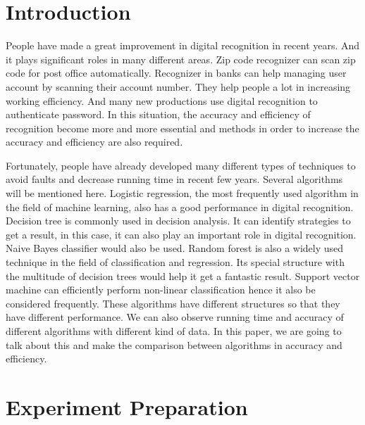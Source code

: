 \documentclass[sigconf]{acmart}
\begin{document}


\maketitle



\section{Introduction}

People have made a great improvement in digital recognition in recent years. And it plays significant roles in many different areas. Zip code recognizer can scan zip code for post office automatically. Recognizer in banks can help managing user account by scanning their account number. They help people a lot in increasing working efficiency. And many new productions use digital recognition to authenticate password. In this situation, the accuracy and efficiency of recognition become more and more essential and methods in order to increase the accuracy and efficiency are also required.

Fortunately, people have already developed many different types of techniques to avoid faults and decrease running time in recent few years. Several algorithms will be mentioned here. Logistic regression, the most frequently used algorithm in the field of machine learning, also has a good performance in digital recognition. Decision tree is commonly used in decision analysis. It can identify strategies to get a result, in this case, it can also play an important role in digital recognition. Naive Bayes classifier would also be used. Random forest is also a widely used technique in the field of classification and regression. Its special structure with the multitude of decision trees would help it get a fantastic result. Support vector machine can efficiently perform non-linear classification hence it also be considered frequently. These algorithms have different structures so that they have different performance. We can also observe running time and accuracy of different algorithms with different kind of data. In this paper, we are going to talk about this and make the comparison between algorithms in accuracy and efficiency.

\section{Experiment Preparation}
\end{document}
